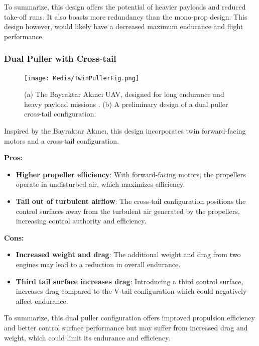 \documentclass[12pt]{article}
\begin{document}
	To summarize, this design offers the potential of heavier payloads and reduced take-off runs. It also boasts more redundancy than the mono-prop design. This design however, would likely have a decreased maximum endurance and flight performance.
	
	\newpage
	
	\subsubsection{Dual Puller with Cross-tail}
	\begin{figure}[h!]
		\centering
		\texttt{[image: Media/TwinPullerFig.png]} %
		\caption{(a) The Bayraktar Akıncı UAV, designed for long endurance and heavy payload missions \cite{}. (b) A preliminary design of a dual puller cross-tail configuration.}
	\end{figure}
	Inspired by the Bayraktar Akıncı, this design incorporates twin forward-facing motors and a cross-tail configuration.
	
	\textbf{Pros:}
	\begin{itemize}
		\item \textbf{Higher propeller efficiency}: With forward-facing motors, the propellers operate in undisturbed air, which maximizes efficiency. 
		\item \textbf{Tail out of turbulent airflow}: The cross-tail configuration positions the control surfaces away from the turbulent air generated by the propellers, increasing control authority and efficiency. 
	\end{itemize}
	
	\textbf{Cons:}
	\begin{itemize}
		\item \textbf{Increased weight and drag}: The additional weight and drag from two engines may lead to a reduction in overall endurance.
		\item \textbf{Third tail surface increases drag}: Introducing a third control surface, increases drag compared to the V-tail configuration which could negatively affect endurance.
	\end{itemize}
	
	To summarize, this dual puller configuration offers improved propulsion efficiency and better control surface performance but may suffer from increased drag and weight, which could limit its endurance and efficiency.
	
		

	
\end{document}
